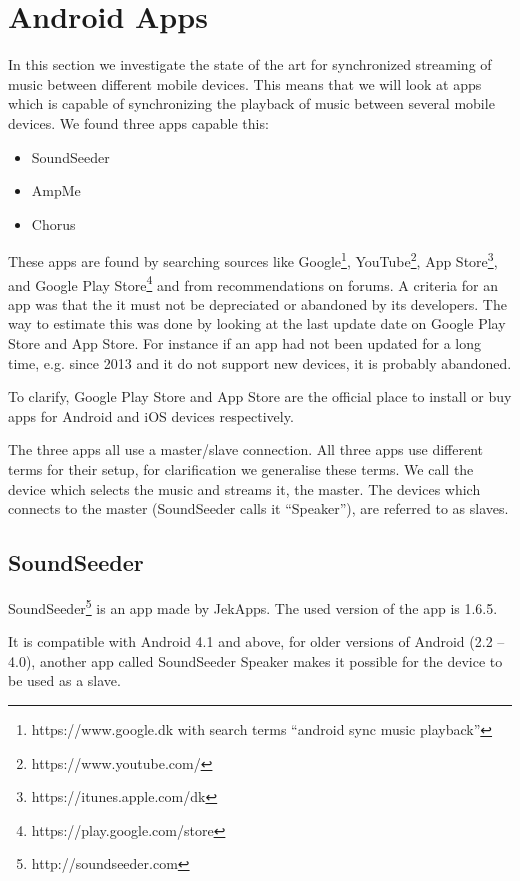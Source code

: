 \section{Android Apps}\label{sec:sota_apps}
In this section we investigate the state of the art for synchronized streaming of music between different mobile devices.
This means that we will look at apps which is capable of synchronizing the playback of music between several mobile devices.
We found three apps capable this:
\begin{itemize}
    \item SoundSeeder
    \item AmpMe
    \item Chorus
\end{itemize}

These apps are found by searching sources like Google\footnote{https://www.google.dk with search terms ``android sync music playback''}, YouTube\footnote{https://www.youtube.com/}, App Store\footnote{https://itunes.apple.com/dk}, and Google Play Store\footnote{https://play.google.com/store} and from recommendations on forums.
A criteria for an app was that the it must not be depreciated or abandoned by its developers.
The way to estimate this was done by looking at the last update date on Google Play Store and App Store.
For instance if an app had not been updated for a long time, e.g. since 2013 and it do not support new devices, it is probably abandoned.

To clarify, Google Play Store and App Store are the official place to install or buy apps for Android and iOS devices respectively.

The three apps all use a master/slave connection.
All three apps use different terms for their setup, for clarification we generalise these terms.
We call the device which selects the music and streams it, the master.
The devices which connects to the master (SoundSeeder calls it ``Speaker''), are referred to as slaves.

\subsection{SoundSeeder}\label{subsec:soundseeder}
SoundSeeder\footnote{http://soundseeder.com} is an app made by JekApps.
The used version of the app is 1.6.5.

It is compatible with Android 4.1 and above, for older versions of Android (2.2 -- 4.0),
another app called SoundSeeder Speaker makes it possible for the device to be used as a slave.

